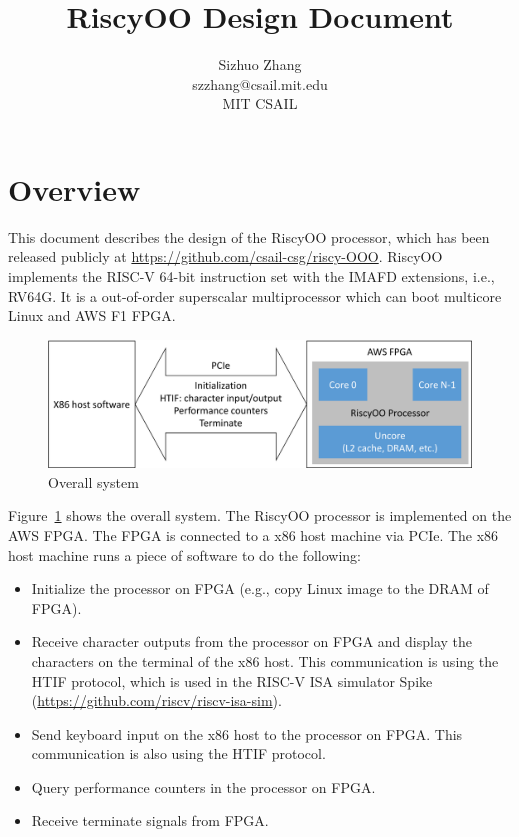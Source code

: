 \documentclass[12pt]{article}
\begin{document}
\title{RiscyOO Design Document}
\author{Sizhuo Zhang \\ szzhang@csail.mit.edu \\ MIT CSAIL}
\date{}
\maketitle

\section{Overview}

This document describes the design of the RiscyOO processor, which has been released publicly at \url{https://github.com/csail-csg/riscy-OOO}.
RiscyOO implements the RISC-V 64-bit instruction set with the IMAFD extensions, i.e., RV64G.
It is a out-of-order superscalar multiprocessor which can boot multicore Linux and AWS F1 FPGA.

\begin{figure}[!htb]
    \centering
    \includegraphics[width=\columnwidth]{fig/system_crop.pdf}
    \caption{Overall system}\label{fig:sys}
\end{figure}

Figure~\ref{fig:sys} shows the overall system.
The RiscyOO processor is implemented on the AWS FPGA.
The FPGA is connected to a x86 host machine via PCIe.
The x86 host machine runs a piece of software to do the following:
\begin{itemize}
    \item Initialize the processor on FPGA (e.g., copy Linux image to the DRAM of FPGA).
    \item Receive character outputs from the processor on FPGA and display the characters on the terminal of the x86 host.
    This communication is using the HTIF protocol, which is used in the RISC-V ISA simulator Spike (\url{https://github.com/riscv/riscv-isa-sim}).
    \item Send keyboard input on the x86 host to the processor on FPGA.
    This communication is also using the HTIF protocol.
    \item Query performance counters in the processor on FPGA.
    \item Receive terminate signals from FPGA.
\end{itemize}
\end{document}

